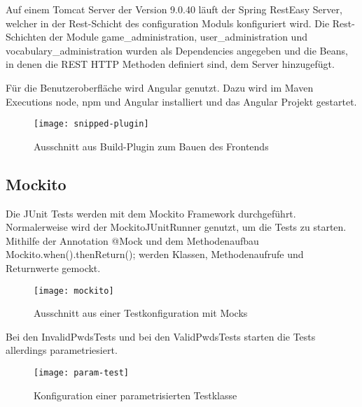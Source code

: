 Auf einem Tomcat Server der Version 9.0.40 läuft der Spring RestEasy Server, welcher
in der Rest-Schicht des configuration Moduls konfiguriert wird.
Die Rest-Schichten der Module game\_administration, user\_administration und vocabulary\_administration
wurden als Dependencies angegeben und die Beans, in denen die REST HTTP Methoden definiert sind,
dem Server hinzugefügt.

Für die Benutzeroberfläche wird Angular genutzt.
Dazu wird im Maven Executions node, npm und Angular installiert und das Angular Projekt gestartet.

\begin{figure}[H]
    \centering
    \texttt{[image: snipped-plugin]}
    \caption[]{Ausschnitt aus Build-Plugin zum Bauen des Frontends}
    \label{fig:snippet}
\end{figure}

\subsection{Mockito}\label{subsec:mockito}

Die JUnit Tests werden mit dem Mockito Framework durchgeführt.
Normalerweise wird der MockitoJUnitRunner genutzt, um die Tests zu starten.
Mithilfe der Annotation @Mock und dem Methodenaufbau Mockito.when().thenReturn(); werden
Klassen, Methodenaufrufe und Returnwerte gemockt.

\begin{figure}[H]
    \centering
    \texttt{[image: mockito]}
    \caption[]{Ausschnitt aus einer Testkonfiguration mit Mocks}
    \label{fig:mockito}
\end{figure}

Bei den InvalidPwdsTests und bei den ValidPwdsTests starten die Tests allerdings parametriesiert.

\begin{figure}[H]
    \centering
    \texttt{[image: param-test]}
    \caption[]{Konfiguration einer parametrisierten Testklasse}
    \label{fig:param}
\end{figure}